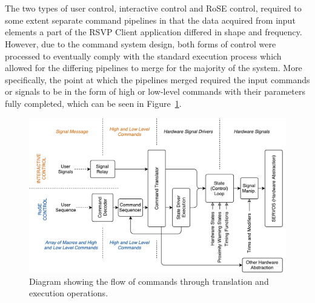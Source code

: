         
        \\\\
          The two types of user control, interactive control and RoSE control, required to some extent separate command pipelines in that the data acquired from input elements a part of the RSVP Client application differed in shape and frequency. However, due to the command system design, both forms of control were processed to eventually comply with the standard execution process which allowed for the differing pipelines to merge for the majority of the system. More specifically, the point at which the pipelines merged required the input commands or signals to be in the form of high or low-level commands with their parameters fully completed, which can be seen in Figure~\ref{fig:softDesign-cmdTranslationFlow}.
          
          \begin{figure}[h!]
            \centering
            \includegraphics[width=1\linewidth]{figures/softDesign-cmdTranslationFlow}
            \caption[Diagram showing the flow of commands through translation and execution operations.]{Diagram showing the flow of commands through translation and execution operations.}
            \label{fig:softDesign-cmdTranslationFlow}
          \end{figure}
          
